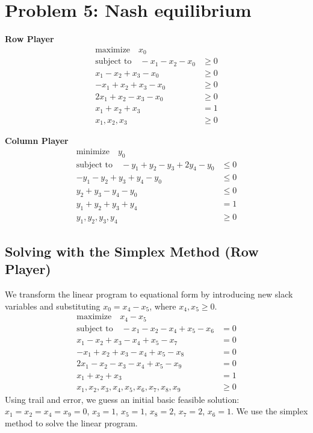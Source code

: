 \documentclass[12pt]{article}
\begin{document}
\newpage
\section*{Problem 5: Nash equilibrium}
\begin{minipage}[t]{0.5\textwidth}
\textbf{Row Player}
\begin{align*}
\text{maximize} \quad x_0 & \\
\text{subject to} \quad  -x_1 - x_2 - x_0 &\geq 0 \\
x_1 - x_2 + x_3 - x_0 &\geq 0 \\
-x_1 + x_2 + x_3 - x_0 &\geq 0 \\
2 x_1 + x_2 - x_3 - x_0 &\geq 0 \\
x_1 + x_2 + x_3  &= 1 \\
x_1, x_2, x_3 &\geq 0
\end{align*}
\end{minipage}
\begin{minipage}[t]{0.5\textwidth}
\textbf{Column Player}
\begin{align*}
\text{minimize} \quad y_0 & \\
\text{subject to} \quad  -y_1 + y_2 - y_3 + 2 y_4 - y_0 &\leq 0 \\
-y_1 - y_2 + y_3 + y_4 - y_0 &\leq 0 \\
y_2 + y_3 - y_4 - y_0 &\leq 0 \\
y_1 + y_2 + y_3 + y_4 &= 1\\
y_1, y_2, y_3, y_4 &\geq 0
\end{align*}
\end{minipage}

\subsection*{Solving with the Simplex Method (Row Player)}
We transform the linear program to equational form by introducing new slack variables and substituting $x_0 = x_4 - x_5$, where $x_4, x_5 \geq 0$.
\begin{align*}
\text{maximize} \quad x_4 - x_5 & \\
\text{subject to} \quad -x_1 - x_2 - x_4 + x_5 - x_6 &= 0 \\
x_1 - x_2 + x_3 - x_4 + x_5 - x_7 &= 0 \\
-x_1 + x_2 + x_3 - x_4 + x_5 - x_8 &= 0 \\
2 x_1 - x_2 - x_3 - x_4 + x_5 - x_9 &= 0 \\
x_1 + x_2 + x_3 &= 1\\
x_1, x_2, x_3, x_4, x_5, x_6, x_7, x_8, x_9 &\geq 0
\end{align*}
Using trail and error, we guess an initial basic feasible solution: $x_1 = x_2 = x_4 = x_9 = 0$, $x_3 = 1$, $x_5 = 1$, $x_8 = 2$, $x_7 = 2$, $x_6 = 1$. We use the simplex method to solve the linear program.
\end{document}
